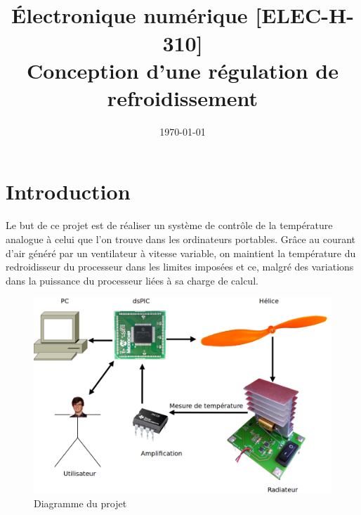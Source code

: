 \documentclass[11pt,a4paper]{article}
\date{\vspace{-1.7cm}\mydate\today}
\title{\vspace{-2cm} \labonumber\\ Électronique numérique [ELEC-H-310]\\Conception d'une régulation de refroidissement\ifthenelse{\boolean{corrige}}{~\\Corrigé}{}}
\theoremstyle{definition}%
\begin{document}
\pagestyle{empty}
\maketitle



\section{Introduction}
Le but de ce projet est de réaliser un système de contrôle de la température analogue à celui que l'on trouve dans les ordinateurs portables.
Grâce au courant d'air généré par un ventilateur à vitesse variable, on maintient la température du redroidisseur du processeur dans les limites imposées et ce, malgré des variations dans la puissance du processeur liées à sa charge de calcul.

\begin{center}
\begin{figure}[H]
\includegraphics[width=\textwidth]{workflow}
\caption{Diagramme du projet}
\label{fig:workflow}
\end{figure}
\end{center}
\end{document}
